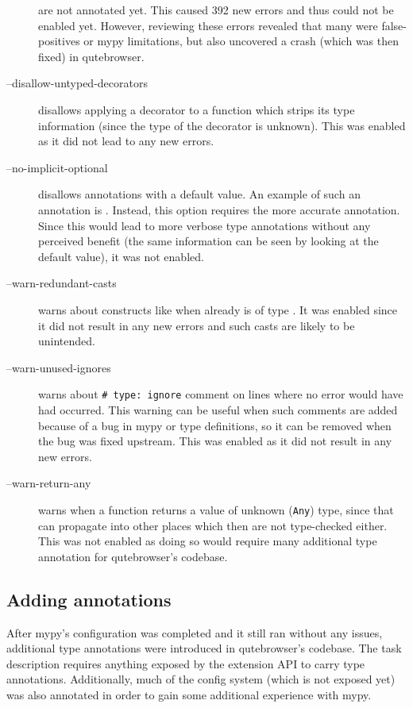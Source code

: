 \begin{description}
    are not annotated yet. This caused 392 new errors and thus could not be
    enabled yet. However, reviewing these errors revealed that many were
    false-positives or mypy limitations, but also uncovered a crash (which was
    then fixed) in qutebrowser.
  \item[--disallow-untyped-decorators] disallows applying a decorator to a
    function which strips its type information (since the type of the decorator
    is unknown). This was enabled as it did not lead to any new errors.
  \item[--no-implicit-optional] disallows annotations with a  default
    value. An example of such an annotation is .
    Instead, this option requires the more accurate 
    annotation. Since this would lead to more verbose type annotations without any
    perceived benefit (the same information can be seen by looking at the default
    value), it was not enabled.
  \item[--warn-redundant-casts] warns about constructs like  when  already is of type . It was enabled since it
    did not result in any new errors and such casts are likely to be unintended.
  \item[--warn-unused-ignores] warns about \texttt{# type: ignore}
    comment on lines where no error would have had occurred. This warning can
    be useful when such comments are added because of a bug in mypy or type
    definitions, so it can be removed when the bug was fixed upstream.
    This was enabled as it did not result in any new errors.
  \item[--warn-return-any] warns when a function returns a value of unknown
    (\verb|Any|) type, since that can propagate into other places which then are
    not type-checked either. This was not enabled as doing so would require many
    additional type annotation for qutebrowser's codebase.
\end{description}

\subsection{Adding annotations}

After mypy's configuration was completed and it still ran without any issues,
additional type annotations were introduced in qutebrowser's codebase. The task
description requires anything exposed by the extension API to carry type
annotations. Additionally, much of the config system (which is not exposed yet)
was also annotated in order to gain some additional experience with mypy.

